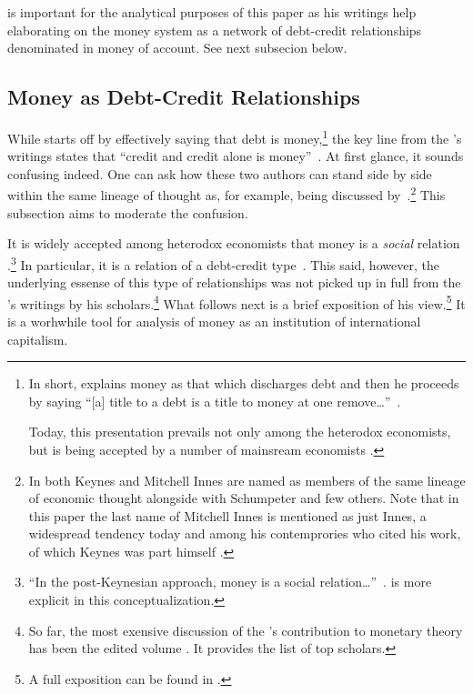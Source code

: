 \citeauthor{innes1913} is important for the analytical purposes of this paper as his writings \citep{innes1909,innes1910,innes1913,innes1914,innes1914a} help elaborating on the money system as a network of debt-credit relationships denominated in money of account. See next subsecion below.

\subsection{Money as Debt-Credit Relationships}

While \cite{keynes1930a} starts off by effectively saying that debt is money,\footnote{In short, \cite{keynes1930a} explains money as that which discharges debt and then he proceeds by saying ``[a] title to a debt is a title to money at one remove\dots''~\citep[15]{keynes1930a}.\par Today, this presentation prevails not only among the heterodox economists, but is being accepted by a number of mainsream economists \citep[see][]{boe_money}.} the key line from the \citeauthor{innes1913}'s writings states that ``credit and credit alone is money''~\citep[p.~392]{innes1913}. At first glance, it sounds confusing indeed. One can ask how these two authors can stand side by side within the same lineage of thought as, for example, being discussed by~\cite{lakomski}.\footnote{In \cite[p.~490]{lakomski} both Keynes and Mitchell Innes are named as members of the same lineage of economic thought alongside with Schumpeter and few others. Note that in this paper the last name of Mitchell Innes is mentioned as just Innes, a widespread tendency today and among his contemprories who cited his work, of which Keynes was part himself \citep[see][]{keynes1914}.} This subsection aims to moderate the confusion.

It is widely accepted among heterodox economists that money is a \textit{social} relation \citep{ingham1996,lavoie2014}.\footnote{``In the post-Keynesian approach, money is a social relation\dots''~\citep[p.~188]{lavoie2014}. \cite{ingham1996,ingham2004,ingham2020} is more explicit in this conceptualization.} In particular, it is a relation of a debt-credit type~\citep[see][p.~17]{kregel1996}. This said, however, the underlying essense of this type of relationships was not picked up in full from the \citeauthor{innes1913}'s writings by his scholars.\footnote{So far, the most exensive discussion of the \citeauthor{innes1913}'s contribution to monetary theory has been the edited volume \cite{wray2004}. It provides the list of top scholars.} What follows next is a brief exposition of his view.\footnote{A full exposition can be found in \cite{valchyshen2025}.} It is a worhwhile tool for analysis of money as an institution of international capitalism.

